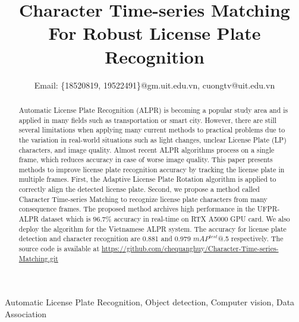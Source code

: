 \documentclass[conference]{IEEEtran}
\begin{document}
\title{Character Time-series Matching For Robust License Plate Recognition\\
}
\author{


Email: \{18520819, 19522491\}@gm.uit.edu.vn, cuongtv@uit.edu.vn
}



\maketitle



\begin{abstract}
Automatic License Plate Recognition (ALPR) is becoming a popular study area and is applied in many fields such as transportation or smart city. However, there are still several limitations when applying many current methods to practical problems due to the variation in real-world situations such as light changes, unclear License Plate (LP) characters, and image quality. Almost recent ALPR algorithms process on a single frame, which reduces accuracy in case of worse image quality. This paper presents methods to improve license plate recognition accuracy by tracking the license plate in multiple frames. First, the Adaptive License Plate Rotation algorithm is applied to correctly align the detected license plate. Second, we propose a method called Character Time-series Matching to recognize license plate characters from many consequence frames. The proposed method archives high performance in the UFPR-ALPR dataset which is \boldmath$96.7\%$ accuracy in real-time on RTX A5000 GPU card. We also deploy the algorithm for the Vietnamese ALPR system. The accuracy for license plate detection and character recognition are 0.881 and 0.979 $mAP^{test}$@.5 respectively. The source code is available at \url{https://github.com/chequanghuy/Character-Time-series-Matching.git}

\end{abstract}

\begin{IEEEkeywords}
Automatic License Plate Recognition, Object detection, Computer vision, Data Association
\end{IEEEkeywords}
\end{document}
